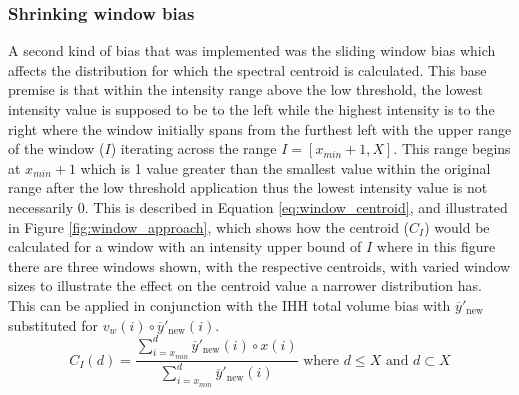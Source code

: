 \subsubsection{Shrinking window bias}
A second kind of bias that was implemented was the sliding window bias which affects the distribution for which the spectral centroid is calculated. This base premise is that within the intensity range above the low threshold, the lowest intensity value is supposed to be to the left while the highest intensity is to the right where the window initially spans from the furthest left with the upper range of the window ($I$) iterating across the range $I=[x_{min}+1, X]$. This range begins at $x_{min}+1$ which is 1 value greater than the smallest value within the original range after the low threshold application thus the lowest intensity value is not necessarily $0$. This is described in Equation \ref{eq:window_centroid}, and illustrated in Figure \ref{fig:window_approach}, which shows how the centroid ($C_I$) would be calculated for a window with an intensity upper bound of $I$ where in this figure there are three windows shown, with the respective centroids, with varied window sizes to illustrate the effect on the centroid value a narrower distribution has. This can be applied in conjunction with the IHH total volume bias with $\overline{y}'_{\text{new}}$ substituted for $v_w(i)\circ \overline{y}'_{\text{new}}(i)$.
\begin{equation}\label{eq:window_centroid}
    C_I(d) = \frac{\sum_{i=x_{min}}^{d} \overline{y}'_{\text{new}}(i)\circ x(i)}{\sum_{i=x_{min}}^{d}\overline{y}'_{\text{new}}(i)} \text{ where } d \leq X \text{ and } d \subset X
\end{equation}
